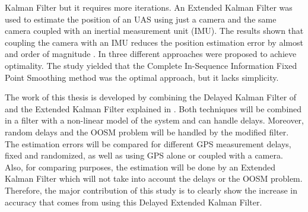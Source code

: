Kalman Filter but it requires more iterations. An Extended Kalman Filter was used to estimate the position of an UAS using just a camera and the same camera coupled with an inertial measurement unit (IMU). The results shown that coupling the camera with an IMU reduces the position estimation error by almost and order of magnitude \cite{Kelly2008}. In \cite{Zhang2012} three different approaches were proposed to achieve optimality. The study yielded that the Complete In-Sequence Information Fixed Point Smoothing method was the optimal approach, but it lacks simplicity. 

The work of this thesis is developed by combining the Delayed Kalman Filter of \cite{Larsen1998} and the Extended Kalman Filter explained in \cite{Beard2010a}. Both techniques will be combined in a filter with a non-linear model of the system and can handle delays. Moreover, random delays and the OOSM problem will be handled by the modified filter. The estimation errors will be compared for different GPS measurement delays, fixed and randomized, as well as using GPS alone or coupled with a camera. Also, for comparing purposes, the estimation will be done by an Extended Kalman Filter which will not take into account the delays or the OOSM problem. Therefore, the major contribution of this study is to clearly show the increase in accuracy that comes from using this Delayed Extended Kalman Filter.